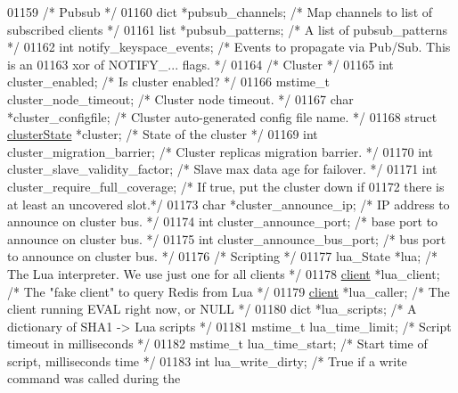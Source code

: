 \begin{DoxyCode}
{{{{{{{01159     \textcolor{comment}{/* Pubsub */}
01160     dict *pubsub\_channels;  \textcolor{comment}{/* Map channels to list of subscribed clients */}
01161     list *pubsub\_patterns;  \textcolor{comment}{/* A list of pubsub\_patterns */}
01162     \textcolor{keywordtype}{int} notify\_keyspace\_events; \textcolor{comment}{/* Events to propagate via Pub/Sub. This is an}
01163 \textcolor{comment}{                                   xor of NOTIFY\_... flags. */}
01164     \textcolor{comment}{/* Cluster */}
01165     \textcolor{keywordtype}{int} cluster\_enabled;      \textcolor{comment}{/* Is cluster enabled? */}
01166     mstime\_t cluster\_node\_timeout; \textcolor{comment}{/* Cluster node timeout. */}
01167     \textcolor{keywordtype}{char} *cluster\_configfile; \textcolor{comment}{/* Cluster auto-generated config file name. */}
01168     \textcolor{keyword}{struct} \hyperlink{structclusterState}{clusterState} *cluster;  \textcolor{comment}{/* State of the cluster */}
01169     \textcolor{keywordtype}{int} cluster\_migration\_barrier; \textcolor{comment}{/* Cluster replicas migration barrier. */}
01170     \textcolor{keywordtype}{int} cluster\_slave\_validity\_factor; \textcolor{comment}{/* Slave max data age for failover. */}
01171     \textcolor{keywordtype}{int} cluster\_require\_full\_coverage; \textcolor{comment}{/* If true, put the cluster down if}
01172 \textcolor{comment}{                                          there is at least an uncovered slot.*/}
01173     \textcolor{keywordtype}{char} *cluster\_announce\_ip;  \textcolor{comment}{/* IP address to announce on cluster bus. */}
01174     \textcolor{keywordtype}{int} cluster\_announce\_port;     \textcolor{comment}{/* base port to announce on cluster bus. */}
01175     \textcolor{keywordtype}{int} cluster\_announce\_bus\_port; \textcolor{comment}{/* bus port to announce on cluster bus. */}
01176     \textcolor{comment}{/* Scripting */}
01177     lua\_State *lua; \textcolor{comment}{/* The Lua interpreter. We use just one for all clients */}
01178     \hyperlink{structclient}{client} *lua\_client;   \textcolor{comment}{/* The "fake client" to query Redis from Lua */}
01179     \hyperlink{structclient}{client} *lua\_caller;   \textcolor{comment}{/* The client running EVAL right now, or NULL */}
01180     dict *lua\_scripts;         \textcolor{comment}{/* A dictionary of SHA1 -> Lua scripts */}
01181     mstime\_t lua\_time\_limit;  \textcolor{comment}{/* Script timeout in milliseconds */}
01182     mstime\_t lua\_time\_start;  \textcolor{comment}{/* Start time of script, milliseconds time */}
01183     \textcolor{keywordtype}{int} lua\_write\_dirty;  \textcolor{comment}{/* True if a write command was called during the}
}}}}}}}
\end{DoxyCode}
